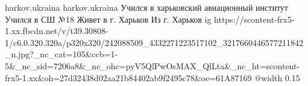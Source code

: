  
 
 
 
 

\par
harkov.ukraina
harkov.ukraina
Учился в харьковский авиационный институт
Учился в СШ №18
Живет в г. Харьков
Из г. Харьков
\ifcmt
  ig https://scontent-frx5-1.xx.fbcdn.net/v/t39.30808-1/c6.0.320.320a/p320x320/242088509_4332271223517102_3217660446577211842_n.jpg?_nc_cat=105&ccb=1-5&_nc_sid=7206a8&_nc_ohc=pyV5QlPwOsMAX_QlLta&_nc_ht=scontent-frx5-1.xx&oh=27d32438d02aa21b84402ab9f2495c78&oe=61A87169
  @width 0.15
\fi


